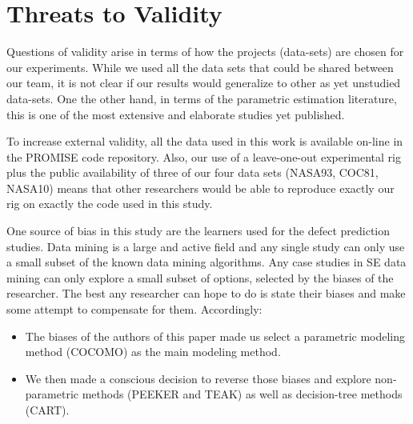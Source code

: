 \documentclass[smallcondesed]{svjour3}
\newcommand{\bi}{\begin{itemize}[leftmargin=0.4cm]}
\newcommand{\ei}{\end{itemize}}
\newenvironment{BLUE}{\color{black}}{\ignorespacesafterend}
\begin{document}


\section{Threats to Validity}









Questions of validity arise in terms of how the
projects (data-sets) are chosen for our experiments.
While we used all the data sets that could be shared
between our team, it is not clear if our results
would generalize to other as yet unstudied
data-sets. One the other hand, in terms of the
parametric estimation literature, this is one of the most extensive
and elaborate studies yet published.

To increase external
validity, all the data used in this work is available
on-line in the PROMISE code repository. Also, our use of a leave-one-out experimental rig
plus the public availability of three of our four data sets (NASA93, COC81, NASA10)
means that other researchers would be able to reproduce exactly
our rig on exactly the code used in this study.


One source of bias in this study
are the learners used for the defect prediction
studies. Data mining is a large and active field and
any single study can only use a small subset of the
known data mining algorithms.
Any case studies
in SE data mining  can only explore a small
subset of options, selected by the biases of the researcher. The best any researcher
can hope to do is state their biases and make some attempt to compensate for them.
Accordingly:
\bi
\item
The
biases of the authors of this paper made us select
a parametric modeling method (COCOMO)  as the main modeling method.
\item
We then made a conscious decision to reverse those biases
and explore non-parametric methods (PEEKER and TEAK) as well
as decision-tree methods (CART).
\ei
\end{document}
